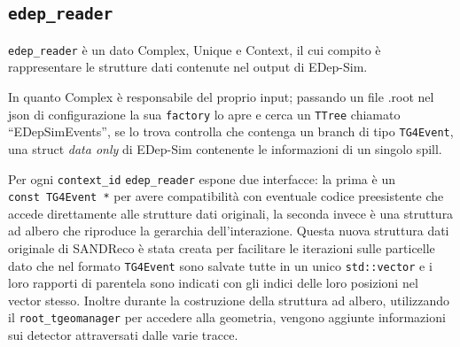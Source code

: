 \documentclass[../../main.tex]{subfiles}
\begin{document}
\subsection*{\texttt{edep\_reader}}
  \texttt{edep\_reader} è un dato Complex, Unique e Context, il cui compito
  è rappresentare le strutture dati contenute nel output di EDep-Sim.

  In quanto Complex è responsabile del proprio input; passando un file .root
  nel json di configurazione la sua \texttt{factory} lo apre e cerca un
  \texttt{TTree} chiamato ``EDepSimEvents'', se lo trova controlla che
  contenga un branch di tipo \texttt{TG4Event}, una struct \textit{data only}
  di EDep-Sim contenente le informazioni di un singolo spill.

  Per ogni \texttt{context\_id} \texttt{edep\_reader} espone due interfacce:
  la prima è un \texttt{const~TG4Event~*} per avere compatibilità
  con eventuale codice preesistente che accede direttamente alle strutture dati
  originali, la seconda invece è una struttura ad albero che riproduce la
  gerarchia dell'interazione.
  Questa nuova struttura dati originale di SANDReco è stata creata per
  facilitare le iterazioni sulle particelle dato che nel formato
  \texttt{TG4Event} sono salvate tutte in un unico \texttt{std::vector}
  e i loro rapporti di parentela sono indicati con gli indici delle loro
  posizioni nel vector stesso.
  Inoltre durante la costruzione della struttura ad albero, utilizzando il
  \texttt{root\_tgeomanager} per accedere alla geometria, vengono aggiunte
  informazioni sui detector attraversati dalle varie tracce.
\end{document}
